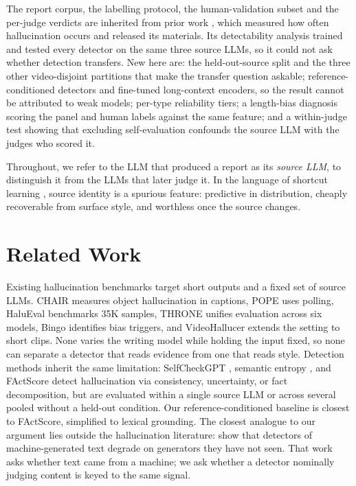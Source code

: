 \documentclass{article}
\begin{document}
The report corpus, the labelling protocol, the human-validation subset and the
per-judge verdicts are inherited from prior work \citep{priorwork2026}, which
measured how often hallucination occurs and released its materials. Its detectability analysis trained and tested every detector on the same three
source LLMs, so it could not ask whether detection transfers. New here are: the
held-out-source split and the three other video-disjoint partitions that make
the transfer question askable; reference-conditioned detectors and fine-tuned
long-context encoders, so the result cannot be attributed to weak models;
per-type reliability tiers; a length-bias diagnosis scoring the panel and human
labels against the same feature; and a within-judge test showing that excluding self-evaluation confounds the source
LLM with the judges who scored it.

Throughout, we refer to the LLM that produced a report as its \emph{source
LLM}, to distinguish it from the LLMs that later judge it. In the language of
shortcut learning \citep{geirhos2020shortcut}, source identity is a spurious
feature: predictive in distribution, cheaply recoverable from surface style,
and worthless once the source changes.

\section{Related Work}

Existing hallucination benchmarks target short outputs and a fixed set of
source LLMs. CHAIR \citep{rohrbach2018object} measures object hallucination in
captions, POPE \citep{li2023evaluating} uses polling, HaluEval
\citep{li2023halueval} benchmarks 35K samples, THRONE \citep{kaul2024throne}
unifies evaluation across six models, Bingo \citep{cui2023holistic} identifies
bias triggers, and VideoHallucer \citep{wang2024videohallucer} extends the
setting to short clips. None varies the writing model while holding the input
fixed, so none can separate a detector that reads evidence from one that reads
style. Detection methods inherit the same limitation: SelfCheckGPT
\citep{manakul2023selfcheckgpt}, semantic entropy \citep{kuhn2023semantic}, and
FActScore \citep{min2023factscore} detect hallucination via consistency,
uncertainty, or fact decomposition, but are evaluated within a single source LLM
or
across several pooled without a held-out condition. Our reference-conditioned
baseline is closest to FActScore, simplified to lexical grounding. The closest
analogue to our argument lies outside the hallucination literature:
\citet{wang2024m4} show that detectors of machine-generated text degrade on
generators they have not seen. That work asks whether text came from a
machine; we ask whether a detector nominally judging content is keyed to the
same signal.
\end{document}
